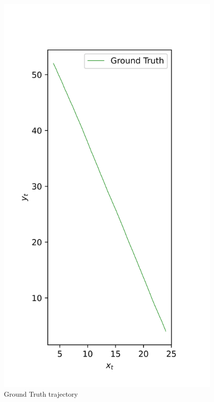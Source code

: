 \begin{figure}[H]
    \centering
    \begin{minipage}{0.32\linewidth}
        \centering
        \includegraphics[width=1.2\linewidth]{plots/part2-e-GT.png}
        \caption*{Ground Truth trajectory}
    \end{minipage}
    \hfill
    \begin{minipage}{0.32\linewidth}

\end{minipage}
\end{figure}
